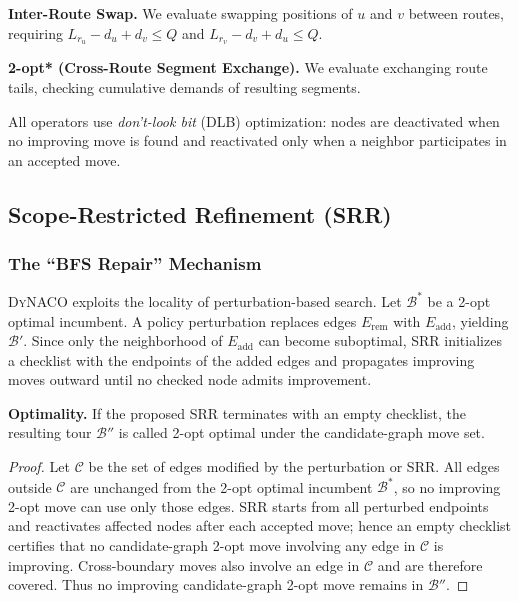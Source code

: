\documentclass[sigconf]{acmart}
\newcommand{\DyNACO}{\textsc{DyNACO}}
\begin{document}
\textbf{Inter-Route Swap.}
We evaluate swapping positions of $u$ and $v$ between routes, requiring $L_{r_u} - d_u + d_v \leq Q$ and $L_{r_v} - d_v + d_u \leq Q$.

\textbf{2-opt* (Cross-Route Segment Exchange).}
We evaluate exchanging route tails, checking cumulative demands of resulting segments.

All operators use \emph{don't-look bit} (DLB) optimization: nodes are deactivated when no improving move is found and reactivated only when a neighbor participates in an accepted move.

\subsection{Scope-Restricted Refinement (SRR)}
\label{app:credit}

\subsubsection{The ``BFS Repair'' Mechanism}
\DyNACO{} exploits the locality of perturbation-based search. Let $\mathcal{B}^*$ be a 2-opt optimal incumbent. A policy perturbation replaces edges $E_{\mathrm{rem}}$ with $E_{\mathrm{add}}$, yielding $\mathcal{B}'$. Since only the neighborhood of $E_{\mathrm{add}}$ can become suboptimal, SRR initializes a checklist with the endpoints of the added edges and propagates improving moves outward until no checked node admits improvement.

\smallskip\noindent\textbf{Optimality.}
If the proposed SRR terminates with an empty checklist, the resulting tour $\mathcal{B}''$ is called 2-opt optimal under the candidate-graph move set.

\begin{proof}
Let $\mathcal{C}$ be the set of edges modified by the perturbation or SRR. All edges outside $\mathcal{C}$ are unchanged from the 2-opt optimal incumbent $\mathcal{B}^*$, so no improving 2-opt move can use only those edges. SRR starts from all perturbed endpoints and reactivates affected nodes after each accepted move; hence an empty checklist certifies that no candidate-graph 2-opt move involving any edge in $\mathcal{C}$ is improving. Cross-boundary moves also involve an edge in $\mathcal{C}$ and are therefore covered. Thus no improving candidate-graph 2-opt move remains in $\mathcal{B}''$.
\end{proof}
\end{document}
